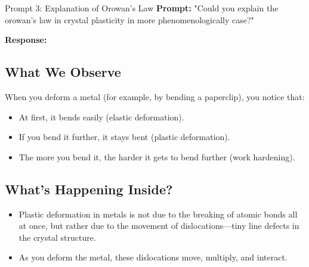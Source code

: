 \documentclass[12pt]{article}
\begin{document}
\begin{summary}{Prompt 3: Explanation of Orowan's Law}
\textbf{Prompt:} "Could you explain the orowan's law in crystal plasticity in more phenomenologically case?"
\vspace{1em}

\textbf{Response:}

\subsection*{What We Observe}
When you deform a metal (for example, by bending a paperclip), you notice that:
\begin{itemize}
  \item At first, it bends easily (elastic deformation).
  \item If you bend it further, it stays bent (plastic deformation).
  \item The more you bend it, the harder it gets to bend further (work hardening).
\end{itemize}

\subsection*{What’s Happening Inside?}
\begin{itemize}
  \item Plastic deformation in metals is not due to the breaking of atomic bonds
  all at once, but rather due to the movement of dislocations---tiny line
  defects in the crystal structure.
  \item As you deform the metal, these dislocations move, multiply, and interact.
\end{itemize}
\end{summary}
\end{document}

